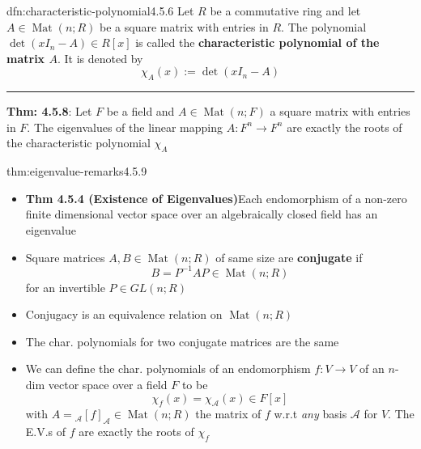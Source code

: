 \documentclass[landscape, 8pt]{extarticle}
\DeclareMathOperator{\Mat}{Mat}
\begin{document}
\begin{multicols}{3}
\vspace{-5pt}
\begin{dfn}{dfn:characteristic-polynomial}{4.5.6}
    Let $R$ be a commutative ring and let $A\in \Mat(n;R)$ be a square matrix with entries in $R$. The polynomial $\det(x I_{n} - A)\in R[x]$ is called the \textbf{characteristic polynomial of the matrix $A$}. It is denoted by
    \[\chi_{A}(x) := \det(x I_{n} - A)\]

    \noindent\rule{\textwidth}{0.2pt}
    \textbf{Thm: 4.5.8}: Let $F$ be a field and $A\in \Mat(n;F)$ a square matrix with entries in $F$. The eigenvalues of the linear mapping $A : F^{n}\to F^{n}$ are exactly the roots of the characteristic polynomial $\chi_{A}$
\end{dfn}

\vspace{-5pt}
\begin{thm}{thm:eigenvalue-remarks}{4.5.9}
    \begin{itemize}[leftmargin=*]
        \setlength\itemsep{0em}

        \item \textbf{Thm 4.5.4 (Existence of Eigenvalues)}Each endomorphism of a non-zero finite dimensional vector space over an algebraically closed field has an eigenvalue
        \item Square matrices $A, B\in \Mat(n;R)$ of same size are \textbf{conjugate} if
            \[B = P^{-1}AP\in \Mat(n; R)\]
            for an invertible $P\in GL(n;R)$
        \item Conjugacy is an equivalence relation on $\Mat(n;R)$
        \item The char. polynomials for two conjugate matrices are the same
        \item We can define the char. polynomials of an endomorphism $f : V\to V$ of an $n$-dim vector space over a field $F$ to be
            \[\chi_{f}(x) = \chi_{\mathcal{A}}(x)\in F[x]\]
            with $A = {}_{\mathcal{A}}[f]_{\mathcal{A}}\in \Mat(n;R)$ the matrix of $f$ w.r.t \textit{any} basis $\mathcal{A}$ for $V$. The E.V.s of $f$ are exactly the roots of $\chi_{f}$
    \end{itemize}
\end{thm}


\end{multicols}
\end{document}
